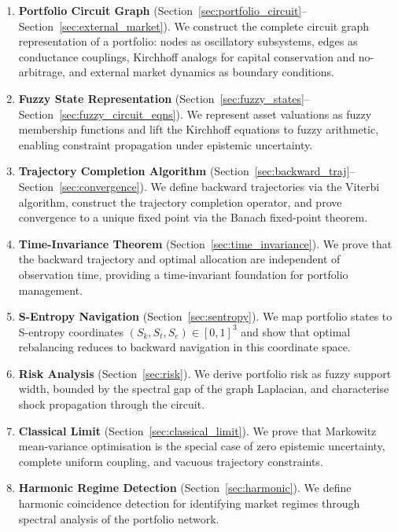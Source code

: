 \documentclass[twocolumn,10pt]{article}
\theoremstyle{remark}
\newcommand{\secref}[1]{Section~\ref{#1}}
\begin{document}
\begin{enumerate}[label=\arabic*.]
    \item \textbf{Portfolio Circuit Graph} (\secref{sec:portfolio_circuit}--\secref{sec:external_market}).  We construct the complete circuit graph representation of a portfolio: nodes as oscillatory subsystems, edges as conductance couplings, Kirchhoff analogs for capital conservation and no-arbitrage, and external market dynamics as boundary conditions.

    \item \textbf{Fuzzy State Representation} (\secref{sec:fuzzy_states}--\secref{sec:fuzzy_circuit_eqns}).  We represent asset valuations as fuzzy membership functions and lift the Kirchhoff equations to fuzzy arithmetic, enabling constraint propagation under epistemic uncertainty.

    \item \textbf{Trajectory Completion Algorithm} (\secref{sec:backward_traj}--\secref{sec:convergence}).  We define backward trajectories via the Viterbi algorithm, construct the trajectory completion operator, and prove convergence to a unique fixed point via the Banach fixed-point theorem.

    \item \textbf{Time-Invariance Theorem} (\secref{sec:time_invariance}).  We prove that the backward trajectory and optimal allocation are independent of observation time, providing a time-invariant foundation for portfolio management.

    \item \textbf{S-Entropy Navigation} (\secref{sec:sentropy}).  We map portfolio states to S-entropy coordinates $(S_k, S_t, S_e) \in [0,1]^3$ and show that optimal rebalancing reduces to backward navigation in this coordinate space.

    \item \textbf{Risk Analysis} (\secref{sec:risk}).  We derive portfolio risk as fuzzy support width, bounded by the spectral gap of the graph Laplacian, and characterise shock propagation through the circuit.

    \item \textbf{Classical Limit} (\secref{sec:classical_limit}).  We prove that Markowitz mean-variance optimisation is the special case of zero epistemic uncertainty, complete uniform coupling, and vacuous trajectory constraints.

    \item \textbf{Harmonic Regime Detection} (\secref{sec:harmonic}).  We define harmonic coincidence detection for identifying market regimes through spectral analysis of the portfolio network.
\end{enumerate}
\end{document}

